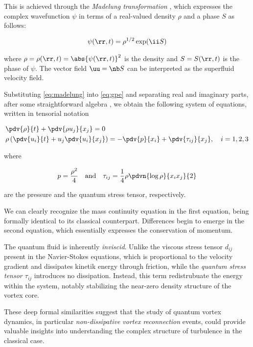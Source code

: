 \medskip

This is achieved through the \emph{Madelung transformation} \cite{madelung1927quantentheorie}, which expresses the complex wavefunction $\psi$ in terms of a real-valued density $\rho$ and a phase $S$ as follows:

\begin{equation}
    \psi(\rr, t) = \rho^{1/2}\exp(\ii S)
    \label{eq:madelung}
\end{equation}

where $\rho = \rho(\rr, t) = \abs{\psi(\rr, t)}^2$ is the density and $S = S(\rr, t)$ is the phase of $\psi$. The vector field $\uu = \nb S$ can be interpreted as the superfluid velocity field.

\medskip

Substituting \eqref{eq:madelung} into \eqref{eq:gpe} and separating real and imaginary parts, after some straightforward algebra \cite{CZ12}, we obtain the following system of equations, written in tensorial notation

\begin{align*}
    &\pdv{\rho}{t} + \pdv{\rho u_j}{x_j} = 0 \\
    &\rho \left(\pdv{u_i}{t} + u_j \pdv{u_i}{x_j}\right) = -\pdv{p}{x_i} + \pdv{\tau_{ij}}{x_j}, \quad i = 1,2,3
\end{align*}

where 

\[
    p = \frac{\rho^2}{4} \quad \text{and} \quad \tau_{ij} = \frac14 \rho \pdvn{\log \rho}{x_i x_j}{2}
\]

are the pressure and the quantum stress tensor, respectively.

We can clearly recognize the mass continuity equation in the first equation, being formally identical to its classical counterpart. Differences begin to emerge in the second equation, which essentially expresses the conservation of momentum.

The quantum fluid is inherently \emph{inviscid}. Unlike the viscous stress tensor $d_{ij}$ \cite{noteZ} present in the Navier-Stokes equations, which is proportional to the velocity gradient and dissipates kinetik energy through friction, while the \emph{quantum stress tensor $\tau_{ij}$} introduces no dissipation. Instead, this term redistrubuate the energy within the system\cite{Tanogami2021}, notably stabilizing the near-zero density structure of the vortex core.

These deep formal similarities suggest that the study of quantum vortex dynamics, in particular \emph {non-dissipative vortex reconnection} events, could provide valuable insights into understanding the complex structure of turbulence in the classical case.

